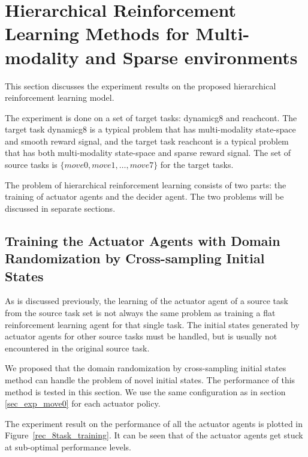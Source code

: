 
\section{Hierarchical Reinforcement Learning Methods for Multi-modality and Sparse environments}
This section discusses the experiment results on the proposed hierarchical reinforcement learning model.

The experiment is done on a set of target tasks: dynamicg8 and reachcont. The target task dynamicg8 is a typical problem that has multi-modality state-space and smooth reward signal, and the target task reachcont is a typical problem that has both multi-modality state-space and sparse reward signal. The set of source tasks is  $\{move0, move1, \dots, move7 \}$ for the target tasks.

The problem of hierarchical reinforcement learning consists of two parts: the training of actuator agents and the decider agent. The two problems will be discussed in separate sections.


\subsection{Training the Actuator Agents with Domain Randomization by Cross-sampling Initial States}
As is discussed previously, the learning of the actuator agent of a source task from the source task set is not always the same problem as training a flat reinforcement learning agent for that single task. The initial states generated by actuator agents for other source tasks must be handled, but is usually not encountered in the original source task.

We proposed that the domain randomization by cross-sampling initial states method can handle the problem of novel initial states. The performance of this method is tested in this section. We use the same configuration as in section \ref{sec_exp_move0} for each actuator policy.  

The experiment result on the performance of all the actuator agents is plotted in Figure~\ref{rec_8task_training}. It can be seen that of the actuator agents get stuck at sub-optimal performance levels. 

